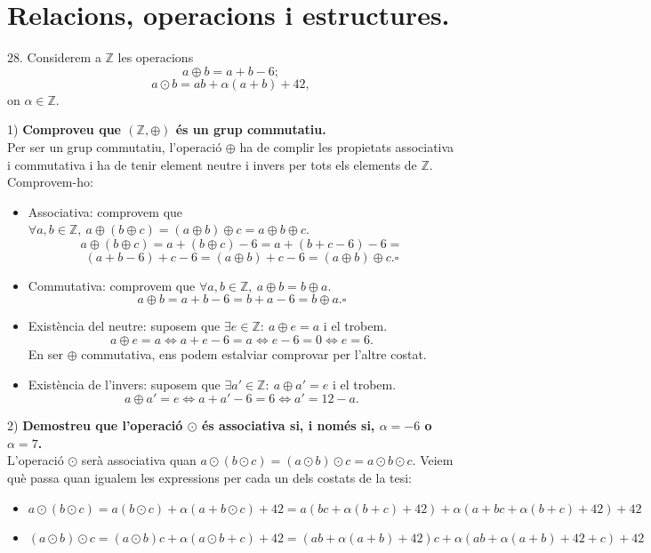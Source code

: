 \documentclass[11pt]{article}
\begin{document}
\section{Relacions, operacions i estructures.}
\begin{legal}
	\item[28.] Considerem a $\mathbb{Z}$ les operacions
	$$a\oplus b=a+b-6;$$
	$$a\odot b=ab+\alpha(a+b)+42,$$
	on $\alpha\in\mathbb{Z}$.
	\begin{legal}
		\item[1)] \textbf{Comproveu que $(\mathbb{Z},\oplus)$ és un grup commutatiu.}\\
		Per ser un grup commutatiu, l'operació $\oplus$ ha de complir les propietats associativa i commutativa i ha de tenir element neutre i invers per tots els elements de $\mathbb{Z}$. Comprovem-ho:
		\begin{itemize}
			\item Associativa: comprovem que $\forall a,b\in\mathbb{Z},\ a\oplus(b\oplus c)=(a\oplus b)\oplus c=a\oplus b\oplus c$.
			$$a\oplus(b\oplus c)=a+(b\oplus c)-6=a+(b+c-6)-6=$$
			$$(a+b-6)+c-6=(a\oplus b)+c-6=(a\oplus b)\oplus c.\square$$
			\item Commutativa: comprovem que $\forall a,b\in\mathbb{Z},\ a\oplus b=b\oplus a$.\\
			$$a\oplus b=a+b-6=b+a-6=b\oplus a.\square$$
			\item Existència del neutre: suposem que $\exists e\in\mathbb{Z}:\ a\oplus e=a$ i el trobem.
			$$a\oplus e=a\iff a+e-6=a\iff e-6=0\iff e=6.$$
			En ser $\oplus$ commutativa, ens podem estalviar comprovar per l'altre costat.
			\item Existència de l'invers: suposem que $\exists a'\in\mathbb{Z}:\ a\oplus a'=e$ i el trobem.
			$$a\oplus a'=e\iff a+a'-6=6\iff a'=12-a.$$
		\end{itemize}
		\item[2)] \textbf{Demostreu que l'operació $\odot$ és associativa si, i només si, $\alpha=-6$ o $\alpha=7$.}\\
		L'operació $\odot$ serà associativa quan $a\odot(b\odot c)=(a\odot b)\odot c=a\odot b\odot c$. Veiem què passa quan igualem les expressions per cada un dels costats de la tesi:
		\begin{itemize}
			\item $a\odot(b\odot c)=a(b\odot c)+\alpha(a+b\odot c)+42=a(bc+\alpha(b+c)+42)+\alpha(a+bc+\alpha(b+c)+42)+42$
			\item $(a\odot b)\odot c=(a\odot b)c+\alpha(a\odot b+c)+42=(ab+\alpha(a+b)+42)c+\alpha(ab+\alpha(a+b)+42+c)+42$

\end{itemize}
\end{legal}
\end{legal}
\end{document}
